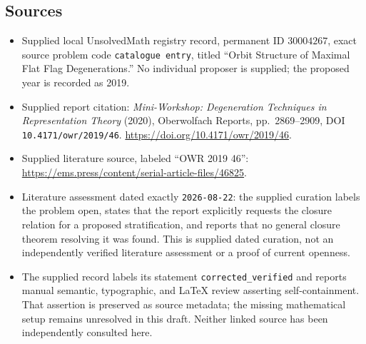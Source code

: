 \documentclass[11pt]{article}
\begin{document}
\subsection{Sources}
\begin{itemize}
\item Supplied local UnsolvedMath registry record, permanent ID \(30004267\), exact source problem code \texttt{catalogue entry}, titled ``Orbit Structure of Maximal Flat Flag Degenerations.'' No individual proposer is supplied; the proposed year is recorded as 2019.
\item Supplied report citation: \emph{Mini-Workshop: Degeneration Techniques in Representation Theory} (2020), Oberwolfach Reports, pp.~2869--2909, DOI \texttt{10.4171/owr/2019/46}. \url{https://doi.org/10.4171/owr/2019/46}.
\item Supplied literature source, labeled ``OWR 2019 46'': \url{https://ems.press/content/serial-article-files/46825}.
\item Literature assessment dated exactly \texttt{2026-08-22}: the supplied curation labels the problem open, states that the report explicitly requests the closure relation for a proposed stratification, and reports that no general closure theorem resolving it was found. This is supplied dated curation, not an independently verified literature assessment or a proof of current openness.
\item The supplied record labels its statement \texttt{corrected\_verified} and reports manual semantic, typographic, and LaTeX review asserting self-containment. That assertion is preserved as source metadata; the missing mathematical setup remains unresolved in this draft. Neither linked source has been independently consulted here.
\end{itemize}
\end{document}
